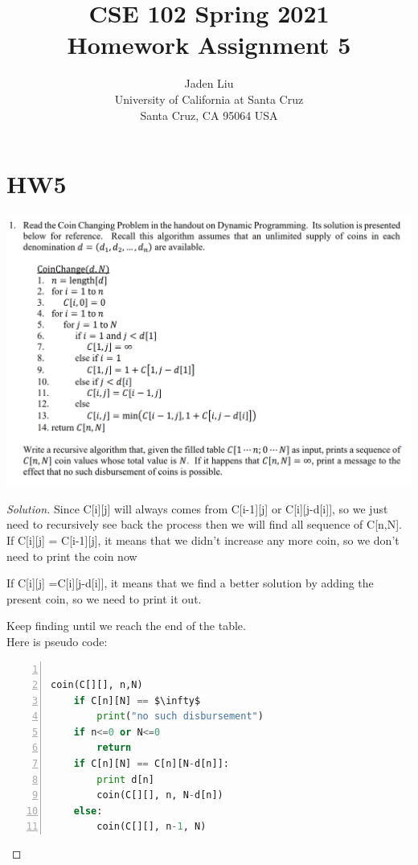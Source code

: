 \documentclass[12pt]{article}
\begin{document}
\title{ CSE 102 Spring 2021\\
	Homework Assignment 5}

\author{Jaden Liu \\ 
University of California at Santa Cruz\\
Santa Cruz, CA 95064 USA }

\maketitle


\section{HW5} 
\includegraphics[scale=0.22]{1.png}
\begin{proof}[Solution]
	Since  C[i][j] will always comes from C[i-1][j] or C[i][j-d[i]], so we just need to recursively see back the process then we will find all sequence of C[n,N].\\
	
	If C[i][j] = C[i-1][j], it means that we didn't increase any more coin, so we don't need to print the coin now
	
	If C[i][j] =C[i][j-d[i]], it means that we find a better solution by adding the present coin, so we need to print it out.
	
	Keep finding until we reach the end of the table.\\
	Here is pseudo code:\\
	\begin{lstlisting}[language={python},numbers=left,numberstyle=\tiny,%frame=shadowbox,  
		rulesepcolor=\color{red!20!green!20!blue!20},  
		keywordstyle=\color{blue!70!black},  
		commentstyle=\color{blue!90!},  
		basicstyle=\ttfamily]  
		
coin(C[][], n,N)
	if C[n][N] == $\infty$
		print("no such disbursement")
	if n<=0 or N<=0
		return
	if C[n][N] == C[n][N-d[n]]:
		print d[n]
		coin(C[][], n, N-d[n])
	else:
		coin(C[][], n-1, N)
	\end{lstlisting}
\end{proof}
\end{document}
